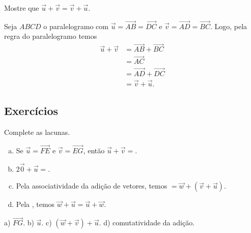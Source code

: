 \begin{exeresol}\label{cap_vetor_sec_op:exeresol:comutatividade_da_adicao}
  Mostre que $\vec{u} + \vec{v} = \vec{v} + \vec{u}$.
\end{exeresol}
\begin{resol}
  Seja $ABCD$ o paralelogramo com $\vec{u} = \overrightarrow{AB} = \overrightarrow{DC}$ e $\vec{v} = \overrightarrow{AD} = \overrightarrow{BC}$. Logo, pela regra do paralelogramo temos
  \begin{align}
    \vec{u} + \vec{v} &= \overrightarrow{AB} + \overrightarrow{BC} \\
                      &= \overrightarrow{AC} \\
                      &= \overrightarrow{AD} + \overrightarrow{DC} \\
                      &= \vec{v} + \vec{u}.
  \end{align}
\end{resol}

\subsection*{Exercícios}

\begin{exer}
  Complete as lacunas.
  \begin{enumerate}[a)]
    \item Se $\vec{u}=\overrightarrow{FE}$ e $\vec{v}=\overrightarrow{EG}$, então $\vec{u}+\vec{v}=$\underline{}.
    \item $2\vec{0}+\vec{u}=$\underline{}.
    \item Pela associatividade da adição de vetores, temos \underline{}$=\vec{w}+(\vec{v}+\vec{u})$.
    \item Pela \underline{\phantom{comutatividade da adição}}, temos $\vec{w}+\vec{u}=\vec{u}+\vec{w}$.
  \end{enumerate}
\end{exer}
\begin{resp}
  a) $\overrightarrow{FG}$. b) $\vec{u}$. c) $(\vec{w}+\vec{v})+\vec{u}$. d) comutatividade da adição.
\end{resp}

